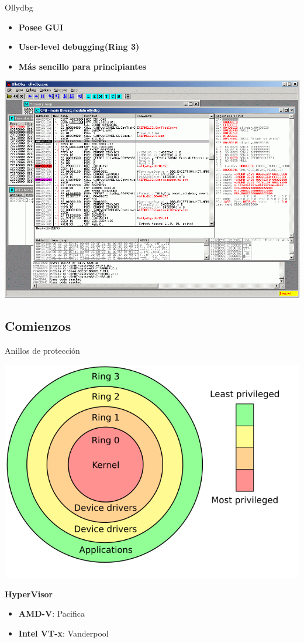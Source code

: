\documentclass{beamer}
\begin{document}
\begin{frame}{Ollydbg}

\begin{itemize}
	\item \textbf{Posee GUI}
	\item \textbf{User-level debugging(Ring 3)} 
	\item \textbf{Más sencillo para principiantes}
\end{itemize}
\includegraphics[scale=0.25]{OllyDbg2.png}
\end{frame}

\subsection{Comienzos}

\begin{frame}{Anillos de protección}
 \begin{center}
\includegraphics[scale=0.35]{Priv_rings.png}
\end{center}
\textbf{HyperVisor}
\begin{itemize}
\item \textbf{AMD-V}: Pacifica
\item \textbf{Intel VT-x}: Vanderpool
\end{itemize}
\end{frame}
\end{document}
